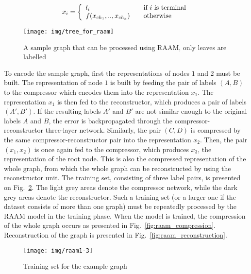 \begin{equation}
x_i = \left\{
\begin{array}{l l}
	l_i & \quad \text{if $i$ is terminal} \\
	f(x_{ch_1}, .., x_{ch_k}) & \quad \text{otherwise}
\end{array}
\right.
\label{eq:raam_representation}
\end{equation}

\begin{figure}
\begin{center}
	\texttt{[image: img/tree\_for\_raam]}
	\caption{A sample graph that can be processed using RAAM, only leaves are labelled}
	\label{fig:tree_for_raam}
\end{center}
\end{figure}

To encode the sample graph, first the representations of nodes $1$ and $2$ must be built. The representation of node $1$ is built by feeding the pair of labels $(A, B)$ to the compressor which encodes them into the representation $x_1$. The representation $x_1$ is then fed to the reconstructor, which produces a pair of labels $(A', B')$. If the resulting labels $A'$ and $B'$ are not similar enough to the original labels $A$ and $B$, the error is backpropagated through the compressor-reconstructor three-layer network. Similarly, the pair $(C, D)$ is compressed by the same compressor-reconstructor pair into the representation $x_2$. Then, the pair $(x_1, x_2)$ is once again fed to the compressor, which produces $x_3$, the representation of the root node. This is also the compressed representation of the whole graph, from which the whole graph can be reconstructed by using the reconstructor unit. The training set, consisting of three label pairs, is presented on Fig.~\ref{fig:raam1-3}. The light grey areas denote the compressor network, while the dark grey areas denote the reconstructor. Such a training set (or a larger one if the dataset consists of more than one graph) must be repeatedly processed by the RAAM model in the training phase. When the model is trained, the compression of the whole graph occurs as presented in Fig.~\ref{fig:raam_compression}. Reconstruction of the graph is presented in Fig.~\ref{fig:raam_reconstruction}.

\begin{figure}
\begin{center}
	\texttt{[image: img/raam1-3]}
	\caption{Training set for the example graph}
	\label{fig:raam1-3}
\end{center}
\end{figure}

